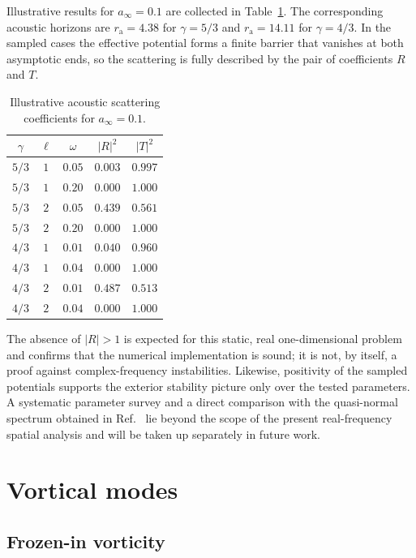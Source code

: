 \documentclass[12pt,a4paper,preprint,nopreprintline]{elsarticle}
\begin{document}
Illustrative results for $a_{\infty}=0.1$ are collected in Table~\ref{tab:acoustic_scattering}. The corresponding acoustic horizons are $r_{\mathrm{a}}=4.38$ for $\gamma=5/3$ and $r_{\mathrm{a}}=14.11$ for $\gamma=4/3$. In the sampled cases the effective potential forms a finite barrier that vanishes at both asymptotic ends, so the scattering is fully described by the pair of coefficients $R$ and $T$.
\begin{table}[ht]
\centering
\caption{Illustrative acoustic scattering coefficients for
$a_{\infty}=0.1$.}
\label{tab:acoustic_scattering}
\begin{tabular}{ccccc}
\toprule
$\gamma$ & $\ell$ & $\omega$ & $|R|^{2}$ & $|T|^{2}$ \\
\midrule
$5/3$ & $1$ & $0.05$ & $0.003$ & $0.997$ \\
$5/3$ & $1$ & $0.20$ & $0.000$ & $1.000$ \\
$5/3$ & $2$ & $0.05$ & $0.439$ & $0.561$ \\
$5/3$ & $2$ & $0.20$ & $0.000$ & $1.000$ \\
$4/3$ & $1$ & $0.01$ & $0.040$ & $0.960$ \\
$4/3$ & $1$ & $0.04$ & $0.000$ & $1.000$ \\
$4/3$ & $2$ & $0.01$ & $0.487$ & $0.513$ \\
$4/3$ & $2$ & $0.04$ & $0.000$ & $1.000$ \\
\bottomrule
\end{tabular}
\end{table}

The absence of $|R|>1$ is expected for this static, real one-dimensional problem and confirms that the numerical implementation is sound; it is not, by itself, a proof against complex-frequency instabilities. Likewise, positivity of the sampled potentials supports the exterior stability picture only over the tested parameters. A systematic parameter survey and a direct comparison with the quasi-normal spectrum obtained in Ref.~\cite{ChaverraE_MoralesMD_SarbachO_QuasinormalAcousticOscillationsInTheMichelFlow_2015} lie beyond the scope of the present real-frequency spatial analysis and will be taken up separately in future work.

\section{Vortical modes}
\label{sec:vortical}

\subsection{Frozen-in vorticity}
\label{sec:frozen_vorticity}
\end{document}
